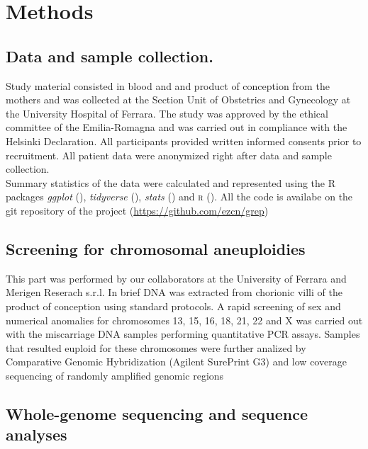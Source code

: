 \chapter{Methods}

\section{Data and sample collection.} 
Study material consisted in blood and and product of conception from the mothers and was collected at the Section Unit of Obstetrics and Gynecology at the University Hospital of Ferrara. The study was approved by the ethical committee of the Emilia-Romagna and was carried out in compliance with the Helsinki Declaration. All participants provided written informed consents prior to recruitment. All patient data were anonymized right after data and sample collection.\\ 


Summary statistics of the data were calculated and represented using the R packages \textit{ggplot} (\cite{ggplot2}), \textit{tidyverse} (\cite{wickham2019welcome}), \textit{stats} (\cite{statsR}) and \textsc{r} (\cite{R}). All the code is availabe on the git repository of the project (\url{https://github.com/ezcn/grep}) 

\section{Screening for chromosomal aneuploidies}
This part was performed by our collaborators at the University of Ferrara and Merigen Reserach s.r.l. In brief DNA was extracted from chorionic villi of the product of conception using standard protocols. A rapid screening of sex and numerical anomalies for chromosomes 13, 15, 16, 18, 21, 22 and X was carried out with the miscarriage DNA samples performing quantitative PCR assays. Samples that resulted euploid for these chromosomes were further analized by Comparative Genomic Hybridization (Agilent SurePrint G3) and low coverage sequencing of randomly amplified genomic regions


\section {Whole-genome sequencing and sequence analyses}

